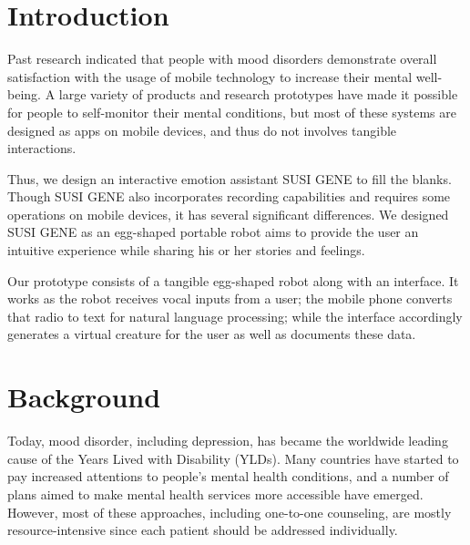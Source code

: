 \documentclass[manuscript,screen]{acmart}
\begin{document}


\maketitle

\section{Introduction}

Past research indicated that people with mood disorders demonstrate overall satisfaction with the usage of mobile technology to increase their mental well-being.\cite{proudfoot2010community}
A large variety of products and research prototypes have made it possible for people to self-monitor their mental conditions, but most of these systems are designed as apps on mobile devices, and thus do not involves tangible interactions.

Thus, we design an interactive emotion assistant SUSI GENE to fill the blanks. Though SUSI GENE also incorporates recording capabilities and requires some operations on mobile devices, it has several significant differences. We designed SUSI GENE as an egg-shaped portable robot aims to provide the user an intuitive experience while sharing his or her stories and feelings. 

Our prototype consists of a tangible egg-shaped robot along with an interface. It works as the robot receives vocal inputs from a user; the mobile phone converts that radio to text for natural language processing; while the interface accordingly generates a virtual creature for the user as well as documents these data.


\section{Background}

Today, mood disorder, including depression, has became the worldwide leading cause of the Years Lived with Disability (YLDs). Many countries have started to pay increased attentions to people’s mental health conditions, and a number of plans aimed to make mental health services more accessible have emerged. However, most of these approaches, including one-to-one counseling, are mostly resource-intensive since each patient should be addressed individually.\cite{world2019special}
\end{document}
